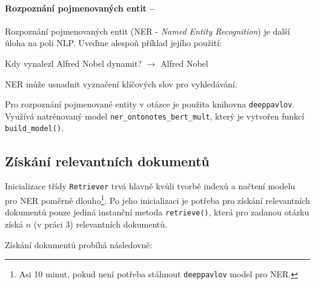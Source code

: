 \paragraph{Rozpoznání pojmenovaných entit --}
Rozpoznání pojmenovaných entit (NER - \emph{Named Entity Recognition}) je další úloha na poli NLP. Uveďme alespoň příklad jejího použití:
\begin{center}
    Kdy vynalezl Alfred Nobel dynamit? $\longrightarrow$ Alfred Nobel
\end{center}
NER může usnadnit vyznačení klíčových slov pro vyhledávání.\par
Pro rozpoznání pojmenované entity v otázce je použita knihovna \texttt{deeppavlov}. Využívá natrénovaný model \texttt{ner\_ontonotes\_bert\_mult}, který je vytvořen funkcí \texttt{build\_model()}.

\subsection{Získání relevantních dokumentů}
Inicializace třídy \texttt{Retriever} trvá hlavně kvůli tvorbě indexů a načtení modelu pro NER poměrně dlouho\footnote{Asi 10 minut, pokud není potřeba stáhnout \texttt{deeppavlov} model pro NER.}. Po jeho inicializaci je potřeba pro získání relevantních dokumentů pouze jediná instanční metoda \texttt{retrieve()}, která pro zadanou otázku získá $n$ (v práci 3) relevantních dokumentů.\par
Získání dokumentů probíhá následovně:
